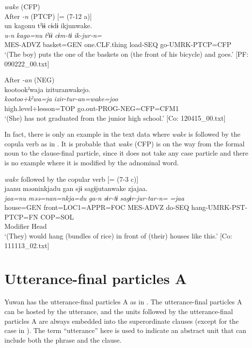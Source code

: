 \ea\label{ex:10.57}   \textit{wake} (CFP)\\
  \ea After \textit{{}-n} (PTCP) [= (7-12 a)]\\
      \glll    un  kagonu  tˀɨɨ  cɨdɨ  ikjunwake.\\
    \textit{u-n}  \textit{kago=nu}  \textit{tˀɨɨ}  \textit{cɨm-tɨ}  \textit{ik-jur-n=}\\
    MES-ADVZ  basket=GEN  one.CLF.thing  load-SEQ  go-UMRK-PTCP=CFP\\
    \glt     ‘(The boy) puts the one of the baskets on (the front of his bicycle) and goes.’ [PF: 090222\_00.txt]

  \ex After \textit{{}-an} (NEG)\\
      \glll    kootookˀwaja  izituranwakejo.\\
    \textit{kootoo+kˀwa=ja}  \textit{izir-tur-an=wake=joo}\\
    high.level+lesson=TOP  go.out-PROG-NEG=CFP=CFM1\\
  \glt     ‘(She) has not graduated from the junior high school.’  [Co: 120415\_00.txt]
  \z
\z


In fact, there is only an example in the text data where \textit{wake} is followed by the copula verb as in . It is probable that \textit{wake} (CFP) is on the way from the formal noun to the clause-final particle, since it does not take any case particle and there is no example where it is modified by the adnominal word.

\ea\label{ex:10.58}   \textit{wake} followed by the copular verb [= (7-3 c)]\\
      \gllll    jaanu  məəninkjadu  gan  sjɨ   sagɨjutanwake  zjajaa.\\
    \textit{jaa=nu}  \textit{məə=nan=nkja=du}  \textit{ga-n}  \textit{sɨr-tɨ} \textit{sagɨr-jur-tar-n=}  \textit{=jaa}\\
    house=GEN  front=LOC1=APPR=FOC  MES-ADVZ  do-SEQ  hang-UMRK-PST-PTCP=FN  COP=SOL\\
    Modifier  Head\\
    \glt  ‘(They) would hang (bundles of rice) in front of (their) houses like this.’ [Co: 111113\_02.txt]
\z

\section{Utterance-final particles A}\label{sec:10.4}

Yuwan has the utterance-final particles A as in . The utterance-final particles A can be hosted by the utterance, and the units followed by the utterance-final particles A are always embedded into the superordinate clauses (except for the case in ). The term “utterance” here is used to indicate an abstract unit that can include both the phrase and the clause.

